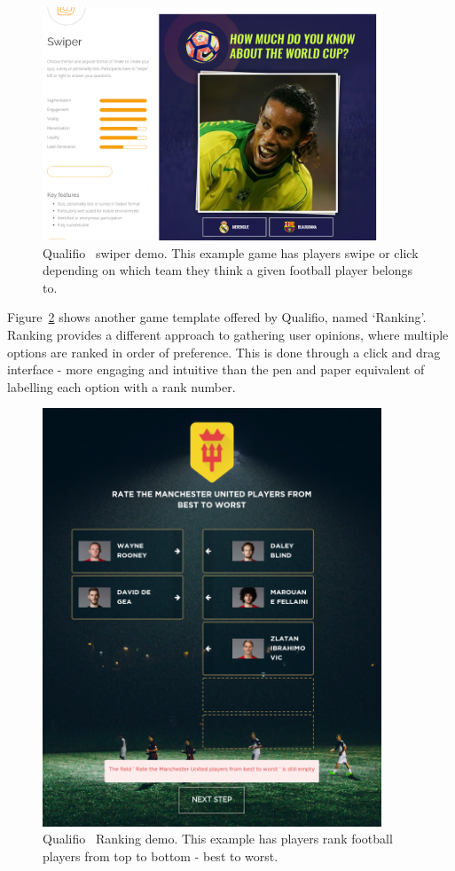 \begin{figure}[!h]
	\centering
	\includegraphics[width=0.9\textwidth]{./images/context/qual.png}
	\caption{Qualifio~\cite{Qualifio} swiper demo. This example game has players swipe or click depending on which team they think a given football player belongs to.}
	\label{fig:qual}
\end{figure}

Figure~\ref{fig:unit} shows another game template offered by Qualifio, named `Ranking'. 
Ranking provides a different approach to gathering user opinions, where multiple options are ranked in order of preference.
This is done through a click and drag interface - more engaging and intuitive than the pen and paper equivalent of labelling each option with a rank number. 

\begin{figure}[!h]
	\centering
	\includegraphics[width=0.9\textwidth]{./images/context/united.png}
	\caption{Qualifio~\cite{Qualifio} Ranking demo. This example has players rank football players from top to bottom - best to worst.}
	\label{fig:unit}
\end{figure}

